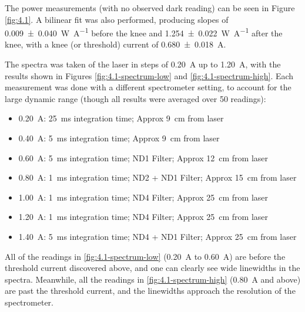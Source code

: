 \documentclass[a4paper]{scrartcl}
\begin{document}
The power measurements (with no observed dark reading) can be seen in Figure \ref{fig:4.1}. A bilinear fit was also performed, producing slopes of \SI{0.009 \pm 0.040}{\watt\per\ampere} before the knee and \SI{1.254 \pm 0.022}{\watt\per\ampere} after the knee, with a knee (or threshold) current of \SI{0.680 \pm 0.018}{\ampere}.

The spectra was taken of the laser in steps of \SI{0.20}{\ampere} up to \SI{1.20}{\ampere}, with the results shown in Figures \ref{fig:4.1-spectrum-low} and \ref{fig:4.1-spectrum-high}. Each measurement was done with a different spectrometer setting, to account for the large dynamic range (though all results were averaged over 50 readings):
\begin{itemize}
    \item \SI{0.20}{\ampere}: \SI{25}{\milli\second} integration time; Approx \SI{9}{\centi\metre} from laser
    \item \SI{0.40}{\ampere}: \SI{5}{\milli\second} integration time; Approx \SI{9}{\centi\metre} from laser
    \item \SI{0.60}{\ampere}: \SI{5}{\milli\second} integration time; ND1 Filter; Approx \SI{12}{\centi\metre} from laser
    \item \SI{0.80}{\ampere}: \SI{1}{\milli\second} integration time; ND2 + ND1 Filter; Approx \SI{15}{\centi\metre} from laser
    \item \SI{1.00}{\ampere}: \SI{1}{\milli\second} integration time; ND4 Filter; Approx \SI{25}{\centi\metre} from laser
    \item \SI{1.20}{\ampere}: \SI{1}{\milli\second} integration time; ND4 Filter; Approx \SI{25}{\centi\metre} from laser
    \item \SI{1.40}{\ampere}: \SI{5}{\milli\second} integration time; ND4 + ND1 Filter; Approx \SI{25}{\centi\metre} from laser
\end{itemize}

All of the readings in \ref{fig:4.1-spectrum-low} (\SI{0.20}{\ampere} to \SI{0.60}{\ampere}) are before the threshold current discovered above, and one can clearly see wide linewidths in the spectra. Meanwhile, all the readings in \ref{fig:4.1-spectrum-high} (\SI{0.80}{\ampere} and above) are past the threshold current, and the linewidths approach the resolution of the spectrometer.
\end{document}
